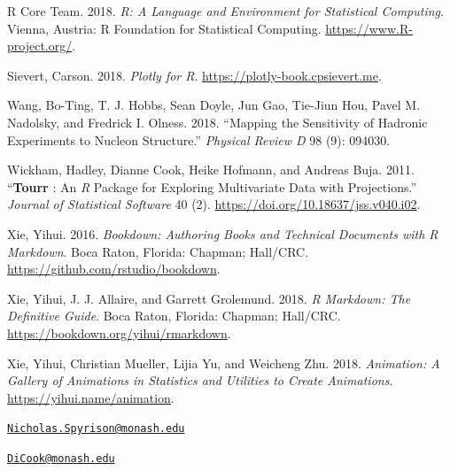 \leavevmode\hypertarget{ref-r_core_team_r:_2018}{}%
R Core Team. 2018. \emph{R: A Language and Environment for Statistical
Computing}. Vienna, Austria: R Foundation for Statistical Computing.
\url{https://www.R-project.org/}.

\leavevmode\hypertarget{ref-sievert_plotly_2018}{}%
Sievert, Carson. 2018. \emph{Plotly for R}.
\url{https://plotly-book.cpsievert.me}.

\leavevmode\hypertarget{ref-wang_mapping_2018}{}%
Wang, Bo-Ting, T. J. Hobbs, Sean Doyle, Jun Gao, Tie-Jiun Hou, Pavel M.
Nadolsky, and Fredrick I. Olness. 2018. ``Mapping the Sensitivity of
Hadronic Experiments to Nucleon Structure.'' \emph{Physical Review D} 98
(9): 094030.

\leavevmode\hypertarget{ref-wickham_tourr_2011}{}%
Wickham, Hadley, Dianne Cook, Heike Hofmann, and Andreas Buja. 2011.
``\textbf{Tourr} : An \emph{R} Package for Exploring Multivariate Data
with Projections.'' \emph{Journal of Statistical Software} 40 (2).
\url{https://doi.org/10.18637/jss.v040.i02}.

\leavevmode\hypertarget{ref-xie_bookdown:_2016}{}%
Xie, Yihui. 2016. \emph{Bookdown: Authoring Books and Technical
Documents with R Markdown}. Boca Raton, Florida: Chapman; Hall/CRC.
\url{https://github.com/rstudio/bookdown}.

\leavevmode\hypertarget{ref-xie_r_2018}{}%
Xie, Yihui, J. J. Allaire, and Garrett Grolemund. 2018. \emph{R
Markdown: The Definitive Guide}. Boca Raton, Florida: Chapman; Hall/CRC.
\url{https://bookdown.org/yihui/rmarkdown}.

\leavevmode\hypertarget{ref-xie_animation:_2018}{}%
Xie, Yihui, Christian Mueller, Lijia Yu, and Weicheng Zhu. 2018.
\emph{Animation: A Gallery of Animations in Statistics and Utilities to
Create Animations}. \url{https://yihui.name/animation}.



\address{%
Nicholas Spyrison\\
Monash University\\
School of Information Technology\\ Monash University, Melbourne, VIC 3800, Australia\\
}
\href{mailto:Nicholas.Spyrison@monash.edu}{\nolinkurl{Nicholas.Spyrison@monash.edu}}

\address{%
Dianne Cook\\
Monash University\\
School of Econometrics and Business Statistics\\ Monash University, Melbourne, VIC 3800, Australia\\
}
\href{mailto:DiCook@monash.edu}{\nolinkurl{DiCook@monash.edu}}

